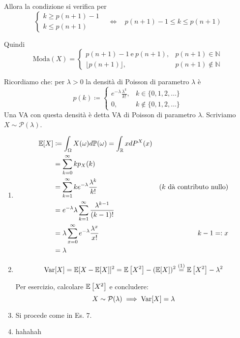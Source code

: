 \begin{enumerate}
Allora la condizione si verifica per
\begin{equation*}
\begin{cases}
k\geq p( n+1) -1\\
k\leq p( n+1)
\end{cases}
 \ \ \ \ \iff \ \ \ \ p( n+1) -1\leq k\leq p( n+1)
\end{equation*}

Quindi
\begin{equation*}
\text{Moda}( X) =\begin{cases}
p( n+1) -1\ \text{e} \ p( n+1) , & p( n+1) \in \mathbb{N}\\
\lfloor p( n+1)\rfloor , & p( n+1) \notin \mathbb{N}
\end{cases}
\end{equation*}
\end{enumerate}
\Soluzione

Ricordiamo che: per $\lambda  >0$ la densità di Poisson di parametro $\lambda $ è
\begin{equation*}
p( k) \coloneqq \begin{cases}
e^{-\lambda }\frac{\lambda ^{k}}{k!} , & k\in \{0,1,2,\dots \}\\
0, & k\notin \{0,1,2,\dots \}
\end{cases}
\end{equation*}
Una VA con questa densità è detta VA di Poisson di parametro $\lambda $. Scriviamo $X\sim \mathcal{P}( \lambda )$.
\begin{enumerate}
\item \begin{align*}
\mathbb{E}[ X] & \coloneqq \int _{\Omega } X( \omega ) d\mathbb{P}( \omega ) =\int _{\mathbb{R}} xdP^{X}( x) & \\
 & =\sum\limits _{k=0}^{\infty } kp_{X}( k) & \\
 & =\sum\limits _{k=1}^{\infty } ke^{-\lambda }\frac{\lambda ^{k}}{k!} & \text{(} k\ \text{dà contributo nullo)}\\
 & =e^{-\lambda } \lambda \sum\limits _{k=1}^{\infty }\frac{\lambda ^{k-1}}{( k-1) !} & \\
 & =\lambda \sum\limits _{x=0}^{\infty } e^{-\lambda }\frac{\lambda ^{x}}{x!} & k-1=:x\\
 & =\lambda  & 
\end{align*}
\item \begin{equation*}
\operatorname{Var}[ X] =\mathbb{E}[ X-\mathbb{E}[ X]]^{2} =\mathbb{E}\left[ X^{2}\right] -(\mathbb{E}[ X])^{2}\overset{( 1)}{=}\mathbb{E}\left[ X^{2}\right] -\lambda ^{2}
\end{equation*}

Per esercizio, calcolare $\mathbb{E}\left[ X^{2}\right]$ e concludere:\begin{equation*}
X\sim \mathcal{P}( \lambda ) \implies \operatorname{Var}[ X] =\lambda 
\end{equation*}
\item Si procede come in Es. 7.
\item hahahah
\end{enumerate}

